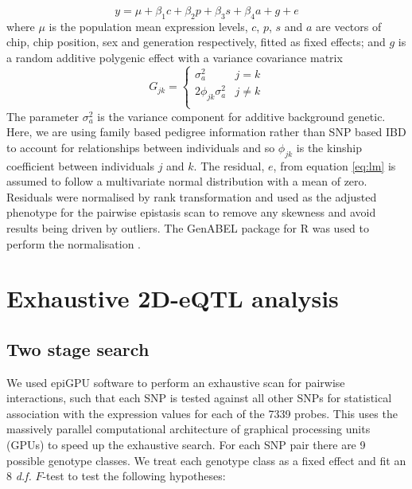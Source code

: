 \documentclass{article}
\begin{document}
\begin{equation}
y = \mu + \beta_{1}c + \beta_{2}p + \beta_{3}s + \beta_{4}a + g + e
\label{eq:lm}
\end{equation}
where $\mu$ is the population mean expression levels, $c$, $p$, $s$ and $a$ are vectors of chip, chip position, sex and generation respectively, fitted as fixed effects; and $g$ is a random additive polygenic effect with a variance covariance matrix 
\begin{equation}
G_{jk} = \left \{ 
\begin{array}{ll}
\sigma _a ^2             &          j = k \\ 
2\phi _{jk} \sigma _a ^2& 			j \neq k \\
\end{array} \right.
\end{equation}
The parameter $\sigma_a^2$ is the variance component for additive background genetic. Here, we are using family based pedigree information rather than SNP based IBD to account for relationships between individuals and so $\phi _{jk}$ is the kinship coefficient between individuals $j$ and $k$. The residual, $e$, from equation \ref{eq:lm} is assumed to follow a multivariate normal distribution with a mean of zero. Residuals were normalised by rank transformation and used as the adjusted phenotype for the pairwise epistasis scan to remove any skewness and avoid results being driven by outliers. The GenABEL package for R was used to perform the normalisation \cite{Aulchenko2007}.


\section{Exhaustive 2D-eQTL analysis}

\subsection{Two stage search}

We used epiGPU \cite{Hemani2011} software to perform an exhaustive scan for pairwise interactions, such that each SNP is tested against all other SNPs for statistical association with the expression values for each of the 7339 probes. This uses the massively parallel computational architecture of graphical processing units (GPUs) to speed up the exhaustive search. For each SNP pair there are 9 possible genotype classes. We treat each genotype class as a fixed effect and fit an 8 \emph{d.f.} $F$-test to test the following hypotheses:
\end{document}
